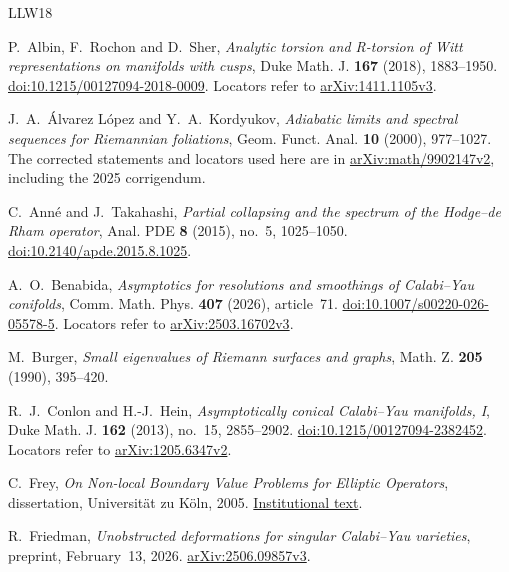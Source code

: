 \begin{thebibliography}{LLW18}

P.~Albin, F.~Rochon and D.~Sher,
\emph{Analytic torsion and R-torsion of Witt representations on manifolds
with cusps},
Duke Math. J. \textbf{167} (2018), 1883--1950.
\href{https://doi.org/10.1215/00127094-2018-0009}
{doi:10.1215/00127094-2018-0009}.
Locators refer to
\href{https://arxiv.org/abs/1411.1105v3}{arXiv:1411.1105v3}.

J.~A.~Álvarez López and Y.~A.~Kordyukov,
\emph{Adiabatic limits and spectral sequences for Riemannian foliations},
Geom. Funct. Anal. \textbf{10} (2000), 977--1027.
The corrected statements and locators used here are in
\href{https://arxiv.org/abs/math/9902147v2}{arXiv:math/9902147v2},
including the 2025 corrigendum.

C.~Anné and J.~Takahashi,
\emph{Partial collapsing and the spectrum of the Hodge--de Rham operator},
Anal. PDE \textbf{8} (2015), no.~5, 1025--1050.
\href{https://doi.org/10.2140/apde.2015.8.1025}
{doi:10.2140/apde.2015.8.1025}.

A.~O.~Benabida,
\emph{Asymptotics for resolutions and smoothings of Calabi--Yau conifolds},
Comm. Math. Phys. \textbf{407} (2026), article~71.
\href{https://doi.org/10.1007/s00220-026-05578-5}
{doi:10.1007/s00220-026-05578-5}.
Locators refer to
\href{https://arxiv.org/abs/2503.16702v3}{arXiv:2503.16702v3}.

M.~Burger,
\emph{Small eigenvalues of Riemann surfaces and graphs},
Math. Z. \textbf{205} (1990), 395--420.

R.~J.~Conlon and H.-J.~Hein,
\emph{Asymptotically conical Calabi--Yau manifolds, I},
Duke Math. J. \textbf{162} (2013), no.~15, 2855--2902.
\href{https://doi.org/10.1215/00127094-2382452}
{doi:10.1215/00127094-2382452}.
Locators refer to
\href{https://arxiv.org/abs/1205.6347v2}{arXiv:1205.6347v2}.

C.~Frey,
\emph{On Non-local Boundary Value Problems for Elliptic Operators},
dissertation, Universität zu Köln, 2005.
\href{https://kups.ub.uni-koeln.de/1512/1/dissertation_frey.pdf}
{Institutional text}.

R.~Friedman,
\emph{Unobstructed deformations for singular Calabi--Yau varieties},
preprint, February~13, 2026.
\href{https://arxiv.org/abs/2506.09857v3}{arXiv:2506.09857v3}.


\end{thebibliography}
